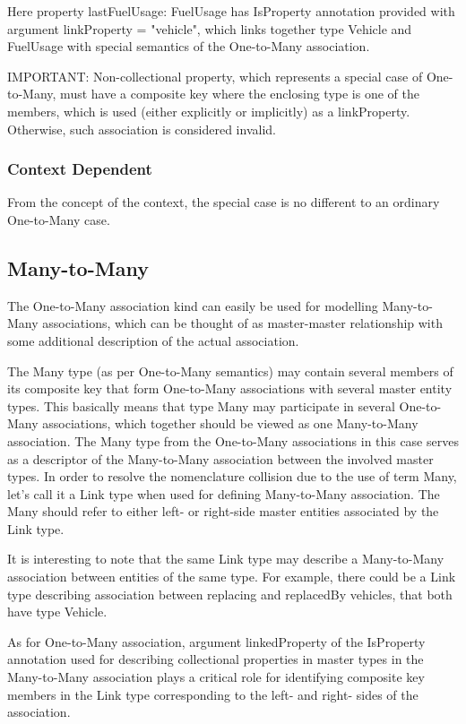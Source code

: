   Here property lastFuelUsage: FuelUsage has IsProperty annotation provided with argument linkProperty = "vehicle", which links together type Vehicle and FuelUsage with special semantics of the One-to-Many association.

  IMPORTANT: Non-collectional property, which represents a special case of One-to-Many, must have a composite key where the enclosing type is one of the members, which is used (either explicitly or implicitly) as a linkProperty. Otherwise, such association is considered invalid.

  \subsubsection{Context Dependent}

  From the concept of the context, the special case is no different to an ordinary One-to-Many case.

\subsection{Many-to-Many}

  The One-to-Many association kind can easily be used for modelling Many-to-Many associations, which can be thought of as master-master relationship with some additional description of the actual association.

  The Many type (as per One-to-Many semantics) may contain several members of its composite key that form One-to-Many associations with several master entity types. This basically means that type Many may participate in several One-to-Many associations, which together should be viewed as one Many-to-Many association. The Many type from the One-to-Many associations in this case serves as a descriptor of the Many-to-Many association between the involved master types. In order to resolve the nomenclature collision due to the use of term Many, let's call it a Link type when used for defining Many-to-Many association. The Many should refer to either left- or right-side master entities associated by the Link type.

  It is interesting to note that the same Link type may describe a Many-to-Many association between entities of the same type. For example, there could be a Link type describing association between replacing and replacedBy vehicles, that both have type Vehicle.

  As for One-to-Many association, argument linkedProperty of the IsProperty annotation used for describing collectional properties in master types in the Many-to-Many association plays a critical role for identifying composite key members in the Link type corresponding to the left- and right- sides of the association.

